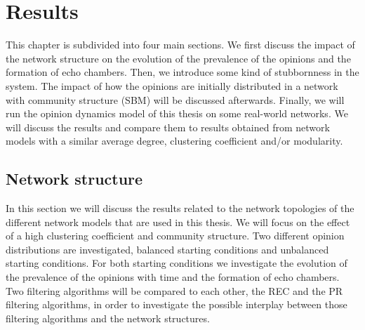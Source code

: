 \documentclass[11 pt , letterpaper , twoside , openright]{book}
\begin{document}
\chapter{Results}

This chapter is subdivided into four main sections. We first discuss the impact of the network structure on the evolution of the prevalence of the opinions and the formation of echo chambers. Then, we introduce some kind of stubbornness in the system. The impact of how the opinions are initially distributed in a network with community structure (SBM) will be discussed afterwards. Finally, we will run the opinion dynamics model of this thesis on some real-world networks. We will discuss the results and compare them to results obtained from network models with a similar average degree, clustering coefficient and/or modularity.

\section{Network structure}\label{netw_struc}

In this section we will discuss the results related to the network topologies of the different network models that are used in this thesis. We will focus on the effect of a high clustering coefficient and community structure. Two different opinion distributions are investigated, balanced starting conditions and unbalanced starting conditions. For both starting conditions we investigate the evolution of the prevalence of the opinions with time and the formation of echo chambers. Two filtering algorithms will be compared to each other, the REC and the PR filtering algorithms, in order to investigate the possible interplay between those filtering algorithms and the network structures.\\
\end{document}
